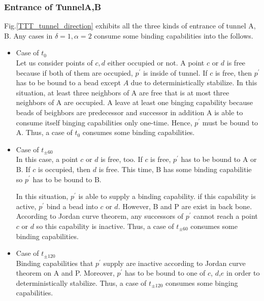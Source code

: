 \documentclass[runningheads]{llncs}
\begin{document}
\subsubsection{Entrance of TunnelA,B}

Fig.\ref{TTT_tunnel_direction} exhibits all the three kinds of entrance of tunnel A, B.
Any cases in $\delta = 1, \alpha = 2$ consume some binding capabilities into the follows.


\begin{itemize}
\item{Case of $t_0$}\\
  Let us consider points of $c,d$ either occupied or not. A point $c$ or $d$ is free because if both of them are occupied, $p^\prime$ is inside of tunnel. If $c$ is free, then $p^\prime$ has to be bound to a bead except $A$ due to deterministically stabilize. In this situation, at least three neighbors of A are free that is at most three neighbors of A are occupied. A leave at least one binging capability because beads of beighbors are predecessor and successor in addition A is able to consume itself binging capabilities only one-time. Hence, $p^\prime$ must be bound to A. Thus, a case of $t_0$ consumes some binding capabilities.

\item{Case of $t_{\pm 60}$}\\
  In this case, a point $c$ or $d$ is free, too. If $c$ is free, $p^\prime$ has to be bound to A or B. If $c$ is occupied, then $d$ is free. This time, B has some binding capabilitie so $p^\prime$ has to be bound to B.
  

  In this situation, $p^\prime$ is able to supply a binding capability. if this capability is active, $p^\prime$ bind a bead into $c$ or $d$. However, B and P are exist in back bone. According to Jordan curve theorem, any successors of $p^\prime$ cannot reach a point $c$ or $d$ so this capability is inactive. Thus, a case of $t_{\pm 60}$ consumes some binding capabilities.

\item{Case of $t_{\pm 120}$}\\
  Binding capabilities that $p^\prime$ supply are inactive according to Jordan curve theorem on A and P. Moreover, $p^\prime$ has to be bound to one of $c$, $d$,$e$ in order to deterministically stabilize.
Thus, a case of $t_{\pm 120}$ consumes some binging capabilities.
  
\end{itemize}
\end{document}
